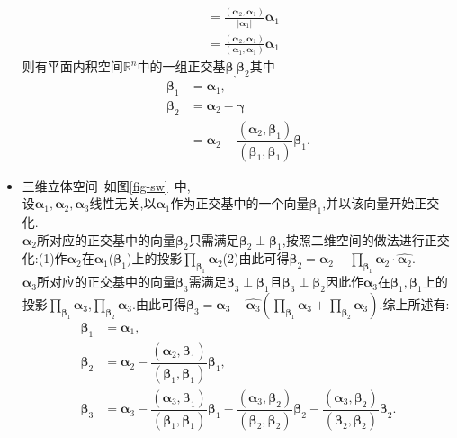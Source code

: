 \documentclass[9pt,a4paper]{book}
\begin{document}
\begin{theorem}
\begin{multicols}{2}
\begin{itemize}
\begin{align*}
&=\frac{(\bm{\alpha}_2,\bm{\alpha}_1)}{|\bm{\alpha}_1|}\bm{\alpha}_1\\
&=\frac{(\bm{\alpha}_2,\bm{\alpha}_1)}{(\bm{\alpha}_1,\bm{\alpha}_1)}\bm{\alpha}_1
	\end{align*}
则有平面内积空间$ \mathbb{R}^n $中的一组正交基$ \bm{\beta}_,\bm{\beta}_2 $其中
	\begin{align*}
\bm{\beta}_1&=\bm{\alpha}_{1},\\
\bm{\beta}_2&=\bm{\alpha}_2-\bm{\gamma}\\&=\bm{\alpha}_{2}-\dfrac{(\bm{\alpha}_2,\bm{\beta}_1)}{(\bm{\beta}_1,\bm{\beta}_1)}\bm{\beta}_1.	\end{align*}

\item 三维立体空间\ 如图\ref{fig-sw}\ 中,\\设$ \bm{\alpha}_1,\bm{\alpha}_2,\bm{\alpha}_3 $线性无关,以$ \bm{\alpha}_1 $作为正交基中的一个向量$ \bm{\beta}_1 $,并以该向量开始正交化.\\$ \bm{\alpha}_2 $所对应的正交基中的向量$ \bm{\beta}_2 $只需满足$  \bm{\beta}_2\perp \bm{\beta}_1$,按照二维空间的做法进行正交化:(1)作$ \bm{\alpha}_2 $在$ \bm{\alpha}_1 $($ \bm{\beta}_1 $)上的投影$\prod_{\bm{\beta}_1}{\bm{\alpha}_2}$(2)由此可得$ \bm{\beta}_2 =\bm{\alpha}_2-\prod_{\bm{\beta}_1}{\bm{\alpha}_2}\cdot\hat{\bm{\alpha}_2}$.\\$ \bm{\alpha}_3 $所对应的正交基中的向量$ \bm{\beta}_3 $需满足$  \bm{\beta}_3\perp \bm{\beta}_1$且$  \bm{\beta}_3\perp \bm{\beta}_2$因此作$ \bm{\alpha}_3 $在$ \bm{\beta}_1,\bm{\beta}_1 $上的投影$\prod_{\bm{\beta}_1}{\bm{\alpha}_3}$,$\prod_{\bm{\beta}_2}{\bm{\alpha}_3}$.由此可得$ \bm{\beta}_3=\bm{\alpha}_3-\hat{\bm{\alpha}_3}\left(\prod_{\bm{\beta}_1}{\bm{\alpha}_3}+\prod_{\bm{\beta}_2}{\bm{\alpha}_3} \right)  $.综上所述有:\begin{align*}
\bm{\beta}_1&=\bm{\alpha}_{1},\\
\bm{\beta}_2&=\bm{\alpha}_{2}-\dfrac{(\bm{\alpha}_2,\bm{\beta}_1)}{(\bm{\beta}_1,\bm{\beta}_1)}\bm{\beta}_1,\\
\bm{\beta}_3&=\bm{\alpha}_{3}-\dfrac{(\bm{\alpha}_3,\bm{\beta}_1)}{(\bm{\beta}_1,\bm{\beta}_1)}\bm{\beta}_1-\dfrac{(\bm{\alpha}_3,\bm{\beta}_2)}{(\bm{\beta}_2,\bm{\beta}_2)}\bm{\beta}_2-\dfrac{(\bm{\alpha}_3,\bm{\beta}_{2})}{(\bm{\beta}_{2},\bm{\beta}_{2})}\bm{\beta}_{2}.\\
\end{align*}
\end{itemize}
\end{multicols}
\end{theorem}
\end{document}
